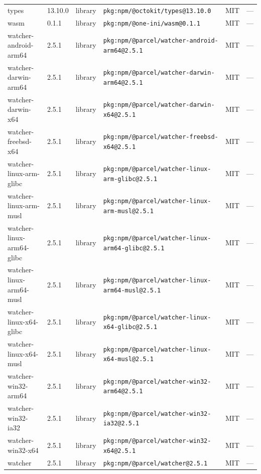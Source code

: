 \documentclass[11pt,a4paper]{article}
\begin{document}
\begin{longtable}{|p{4cm}|p{2cm}|p{1.6cm}|p{5cm}|p{1.5cm}|p{3.5cm}|}
\raggedright types & 13.10.0 & library & \small\texttt{pkg:npm/@octokit/types@13.10.0} & MIT & \small — \\
\raggedright wasm & 0.1.1 & library & \small\texttt{pkg:npm/@one-ini/wasm@0.1.1} & MIT & \small — \\
\raggedright watcher-android-arm64 & 2.5.1 & library & \small\texttt{pkg:npm/@parcel/watcher-android-arm64@2.5.1} & MIT & \small — \\
\raggedright watcher-darwin-arm64 & 2.5.1 & library & \small\texttt{pkg:npm/@parcel/watcher-darwin-arm64@2.5.1} & MIT & \small — \\
\raggedright watcher-darwin-x64 & 2.5.1 & library & \small\texttt{pkg:npm/@parcel/watcher-darwin-x64@2.5.1} & MIT & \small — \\
\raggedright watcher-freebsd-x64 & 2.5.1 & library & \small\texttt{pkg:npm/@parcel/watcher-freebsd-x64@2.5.1} & MIT & \small — \\
\raggedright watcher-linux-arm-glibc & 2.5.1 & library & \small\texttt{pkg:npm/@parcel/watcher-linux-arm-glibc@2.5.1} & MIT & \small — \\
\raggedright watcher-linux-arm-musl & 2.5.1 & library & \small\texttt{pkg:npm/@parcel/watcher-linux-arm-musl@2.5.1} & MIT & \small — \\
\raggedright watcher-linux-arm64-glibc & 2.5.1 & library & \small\texttt{pkg:npm/@parcel/watcher-linux-arm64-glibc@2.5.1} & MIT & \small — \\
\raggedright watcher-linux-arm64-musl & 2.5.1 & library & \small\texttt{pkg:npm/@parcel/watcher-linux-arm64-musl@2.5.1} & MIT & \small — \\
\raggedright watcher-linux-x64-glibc & 2.5.1 & library & \small\texttt{pkg:npm/@parcel/watcher-linux-x64-glibc@2.5.1} & MIT & \small — \\
\raggedright watcher-linux-x64-musl & 2.5.1 & library & \small\texttt{pkg:npm/@parcel/watcher-linux-x64-musl@2.5.1} & MIT & \small — \\
\raggedright watcher-win32-arm64 & 2.5.1 & library & \small\texttt{pkg:npm/@parcel/watcher-win32-arm64@2.5.1} & MIT & \small — \\
\raggedright watcher-win32-ia32 & 2.5.1 & library & \small\texttt{pkg:npm/@parcel/watcher-win32-ia32@2.5.1} & MIT & \small — \\
\raggedright watcher-win32-x64 & 2.5.1 & library & \small\texttt{pkg:npm/@parcel/watcher-win32-x64@2.5.1} & MIT & \small — \\
\raggedright watcher & 2.5.1 & library & \small\texttt{pkg:npm/@parcel/watcher@2.5.1} & MIT & \small — \\

\end{longtable}
\end{document}
